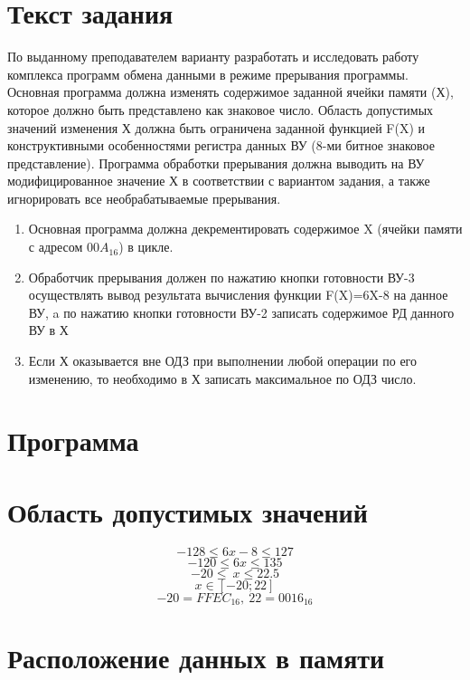 \documentclass{article}
\begin{document}
\itmo[
  variant=8912,
  labn=6,
  discipline=Основы профессиональной деятельности,
  group=P3115,
  student=Владимир Мацюк,
  teacher=Абузов Ярослав Александрович,
  logo=../../lib/img/itmo.png
]


\section{Текст задания}
По выданному преподавателем варианту разработать и исследовать работу комплекса программ обмена данными в режиме прерывания программы. Основная программа должна изменять содержимое заданной ячейки памяти (Х), которое должно быть представлено как знаковое число. Область допустимых значений изменения Х должна быть ограничена заданной функцией F(X) и конструктивными особенностями регистра данных ВУ (8-ми битное знаковое представление). Программа обработки прерывания должна выводить на ВУ модифицированное значение Х в соответствии с вариантом задания, а также игнорировать все необрабатываемые прерывания.


\begin{enumerate}
  \item Основная программа должна декрементировать содержимое X (ячейки памяти с адресом $00A_{16}$) в цикле.
  \item Обработчик прерывания должен по нажатию кнопки готовности ВУ-3 осуществлять вывод результата вычисления функции F(X)=6X-8 на данное ВУ, a по нажатию кнопки готовности ВУ-2 записать содержимое РД данного ВУ в Х
  \item Если Х оказывается вне ОДЗ при выполнении любой операции по его изменению, то необходимо в Х записать максимальное по ОДЗ число.
\end{enumerate}

\section{Программа}



\section{Область допустимых значений}

$$-128 \le 6x-8 \le 127$$
$$-120 \le 6x \le 135 $$
$$-20 \le\ x \le 22.5 $$
$$x \in [-20; 22]$$
$$-20=FFEC_{16},\ 22=0016_{16}$$


\section{Расположение данных в памяти}
\end{document}
